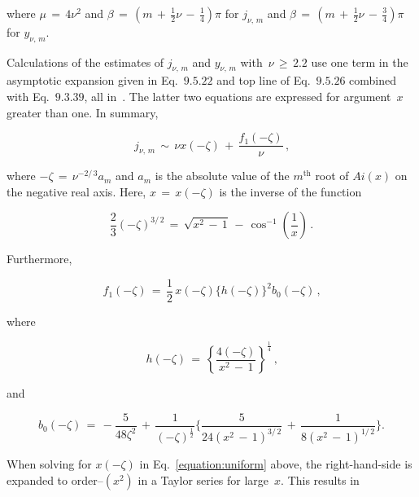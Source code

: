 \documentclass{article}[10pt]
\begin{document}
\noindent
where $\mu\,=\,4\nu^2$
and $\beta\,=\,\left(m\,+\,\frac{1}{2}\nu\,-\,\frac{1}{4}\right)\pi$
for $j_{\nu,\,m}$
and $\beta\,=\,\left(m\,+\,\frac{1}{2}\nu\,-\,\frac{3}{4}\right)\pi$
for $y_{\nu,\,m}$.

\vspace{2pt}

Calculations of the estimates of $j_{\nu,\,m}$ and $y_{\nu,\,m}$
with~$\nu\,\ge\,2.2$ use
one term in the asymptotic expansion given in
Eq.~$9$.$5$.$22$ and top line of Eq.~$9$.$5$.$26$
combined with Eq.~$9$.$3$.$39$, all in~\cite{bibitem:abramowitz}.
The latter two equations are expressed for
argument~$x$ greater than one. In summary,

\begin{equation}
j_{\nu,\,m}
\,\sim\,
\nu x(-\zeta)
\,+\,
\dfrac{f_{1}(-\zeta)}{\nu}
\,{\text{,}}
\end{equation}

\noindent
where $-\zeta\,=\,\nu^{-2/\,3}a_{m}$ and $a_{m}$ is
the absolute value of the $m^{\text{th}}$ root
of $Ai(x)$ on the negative real axis.
Here, $x\,=\,x(-\zeta)$ is the inverse of the function

\begin{equation}
\dfrac{2}{3}
(-\zeta)^{3/\,2}
\,=\,
\sqrt{x^{2}\,-\,1}
\,-\,
\cos^{-1}\left(\dfrac{1}{x}\right)
\,{\text{.}}
\label{equation:uniform}
\end{equation}

\noindent
Furthermore,

\begin{equation}
f_1(-\zeta)
\,=\,
\dfrac{1}{2}\,
x(-\zeta)
\bigl\{h(-\zeta)\bigr\}^{2}
b_{0}(-\zeta)\,
{\text{,}}
\end{equation}

\noindent
where

\begin{equation}
h(-\zeta)
\,=\,
\left\{
\dfrac{4(-\zeta)}{x^2\,-\,1}
\right\}^{\frac{1}{4}}\,
{\text{,}}
\end{equation}

\noindent
and

\begin{equation}
b_{0}(-\zeta)
\,=\,
-\dfrac{5}{48\zeta^{2}}
\,+\,
\dfrac{1}{(-\zeta)^{\frac{1}{2}}}
\Biggl\{
\dfrac{5}{24(x^{2}\,-\,1)^{3/\,2}}
\,+\,
\dfrac{1}{8(x^{2}\,-\,1)^{1/\,2}}
\Biggr\}
{\text{.}}
\end{equation}

When solving for $x(-\zeta)$ in Eq.~\ref{equation:uniform} above,
the right-hand-side is expanded to order--$(x^{2})$ in
a Taylor series for large~$x$. This results in
\end{document}
